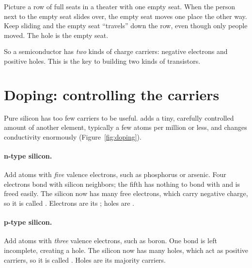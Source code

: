 \begin{everyday}
Picture a row of full seats in a theater with one empty seat. When the person next to the empty seat slides over, the empty seat moves one place the other way. Keep sliding and the empty seat ``travels'' down the row, even though only people moved. The hole is the empty seat.
\end{everyday}

So a semiconductor has \emph{two} kinds of charge carriers: negative electrons and positive holes. This is the key to building two kinds of transistors.

\section{Doping: controlling the carriers}
\label{sec:doping}

Pure silicon has too few carriers to be useful.  adds a tiny, carefully controlled amount of another element, typically a few atoms per million or less, and changes conductivity enormously (Figure~\ref{fig:doping}).

\paragraph{n-type silicon.} Add atoms with \emph{five} valence electrons, such as phosphorus or arsenic. Four electrons bond with silicon neighbors; the fifth has nothing to bond with and is freed easily. The silicon now has many free electrons, which carry negative charge, so it is called . Electrons are its ; holes are .

\paragraph{p-type silicon.} Add atoms with \emph{three} valence electrons, such as boron. One bond is left incomplete, creating a hole. The silicon now has many holes, which act as positive carriers, so it is called . Holes are its majority carriers.

